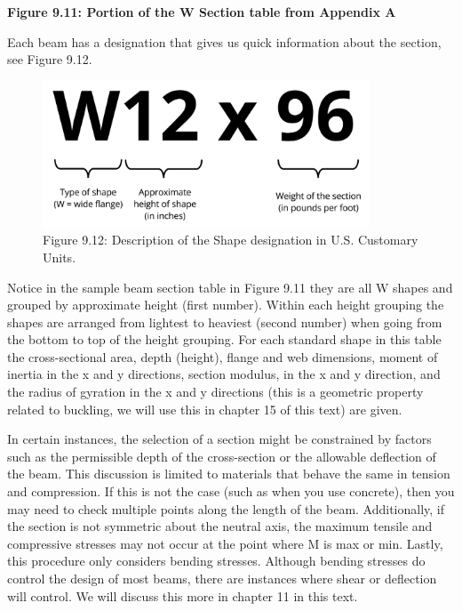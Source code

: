 \documentclass[
  letterpaper,
  DIV=11,
  numbers=noendperiod]{scrreprt}
\begin{document}
\textbf{Figure 9.11: Portion of the W Section table from Appendix A}

Each beam has a designation that gives us quick information about the
section, see Figure 9.12.

\begin{figure}[H]

{\centering \includegraphics[width=3.83333in,height=\textheight]{images/CH9 PNGs/Figure 9.12.png}

}

\caption{Figure 9.12: Description of the Shape designation in U.S.
Customary Units.}

\end{figure}%

Notice in the sample beam section table in Figure 9.11 they are all W
shapes and grouped by approximate height (first number). Within each
height grouping the shapes are arranged from lightest to heaviest
(second number) when going from the bottom to top of the height
grouping. For each standard shape in this table the cross-sectional
area, depth (height), flange and web dimensions, moment of inertia in
the x and y directions, section modulus, in the x and y direction, and
the radius of gyration in the x and y directions (this is a geometric
property related to buckling, we will use this in chapter 15 of this
text) are given.

In certain instances, the selection of a section might be constrained by
factors such as the permissible depth of the cross-section or the
allowable deflection of the beam. This discussion is limited to
materials that behave the same in tension and compression. If this is
not the case (such as when you use concrete), then you may need to check
multiple points along the length of the beam. Additionally, if the
section is not symmetric about the neutral axis, the maximum tensile and
compressive stresses may not occur at the point where M is max or min.
Lastly, this procedure only considers bending stresses. Although bending
stresses do control the design of most beams, there are instances where
shear or deflection will control. We will discuss this more in chapter
11 in this text.
\end{document}
